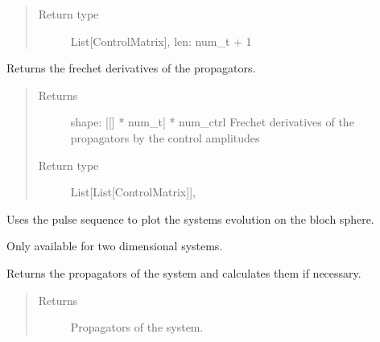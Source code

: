 \documentclass[letterpaper,10pt,english]{sphinxmanual}
\begin{document}
\begin{fulllineitems}
\begin{fulllineitems}
\begin{quote}
\begin{description}
\item[{Return type}] \leavevmode
List{[}ControlMatrix{]}, len: num\_t + 1

\end{description}\end{quote}

\end{fulllineitems}


\begin{fulllineitems}
\label{\detokenize{qsim:qsim.solver_algorithms.Solver.frechet_deriv_propagators}}
Returns the frechet derivatives of the propagators.
\begin{quote}\begin{description}
\item[{Returns}] \leavevmode
{} \textendash{}              shape: {[}{[}{]} * num\_t{]} * num\_ctrl
Frechet derivatives of the propagators by the control amplitudes

\item[{Return type}] \leavevmode
List{[}List{[}ControlMatrix{]}{]},

\end{description}\end{quote}

\end{fulllineitems}


\begin{fulllineitems}
\label{\detokenize{qsim:qsim.solver_algorithms.Solver.plot_bloch_sphere}}
Uses the pulse sequence to plot the systems evolution on the bloch
sphere.

Only available for two dimensional systems.

\end{fulllineitems}


\begin{fulllineitems}
\label{\detokenize{qsim:qsim.solver_algorithms.Solver.propagators}}
Returns the propagators of the system and calculates them if necessary.
\begin{quote}\begin{description}
\item[{Returns}] \leavevmode
{} \textendash{} Propagators of the system.


\end{description}
\end{quote}
\end{fulllineitems}
\end{fulllineitems}
\end{document}
